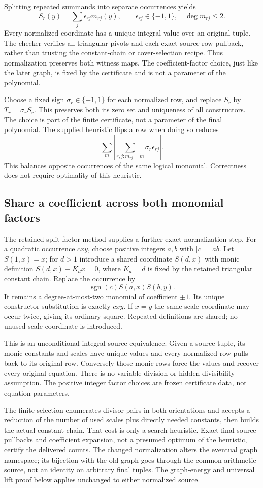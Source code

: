 Splitting repeated summands into separate occurrences yields
\[
 S_r(y)=\sum_j\epsilon_{rj}m_{rj}(y),\qquad \epsilon_{rj}\in\{-1,1\},
 \quad \deg m_{rj}\le2.
\]
Every normalized coordinate has a unique integral value over an original
tuple. The checker verifies all triangular pivots and each exact source-row
pullback, rather than trusting the constant-chain or cover-selection
recipe. Thus normalization preserves both witness maps. The coefficient-factor choice, just like the later graph,
is fixed by the certificate and is not a parameter of the polynomial.

Choose a fixed sign $\sigma_r\in\{-1,1\}$ for each normalized row, and
replace $S_r$ by $T_r=\sigma_rS_r$. This preserves both its zero set and
uniqueness of all constructors. The choice is part of the finite
certificate, not a parameter of the final polynomial. The supplied
heuristic flips a row when doing so reduces
\[
 \sum_m\left|\sum_{r,j:m_{rj}=m}\sigma_r\epsilon_{rj}\right|.
\]
This balances opposite occurrences of the same logical monomial.
Correctness does not require optimality of this heuristic.

\subsection{Share a coefficient across both monomial factors}
The retained split-factor method supplies a further exact normalization step.
For a quadratic occurrence $cxy$, choose positive integers $a,b$ with
$|c|=ab$. Let $S(1,x)=x$; for $d>1$ introduce a shared coordinate
$S(d,x)$ with monic definition $S(d,x)-K_dx=0$, where $K_d=d$
is fixed by the retained triangular constant chain. Replace the occurrence
by
\[
 \operatorname{sgn}(c)S(a,x)S(b,y).
\]
It remains a degree-at-most-two monomial of coefficient $\pm1$.
Its unique constructor substitution is exactly $cxy$. If $x=y$ the
same scale coordinate may occur twice, giving its ordinary square.
Repeated definitions are shared; no unused scale coordinate is introduced.

This is an unconditional integral source equivalence. Given a source
tuple, its monic constants and scales have unique values and every
normalized row pulls back to its original row. Conversely those monic
rows force the values and recover every original equation. There is no
variable division or hidden divisibility assumption. The positive integer
factor choices are frozen certificate data, not equation parameters.

The finite selection enumerates divisor pairs in both orientations and
accepts a reduction of the number of used scales plus directly needed
constants, then builds the actual constant chain. That cost is only a
search heuristic. Exact final source pullbacks and coefficient expansion,
not a presumed optimum of the heuristic, certify the delivered counts.
The changed normalization alters the eventual graph namespace; its
bijection with the old graph goes through the common arithmetic source,
not an identity on arbitrary final tuples. The graph-energy and universal
lift proof below applies unchanged to either normalized source.


